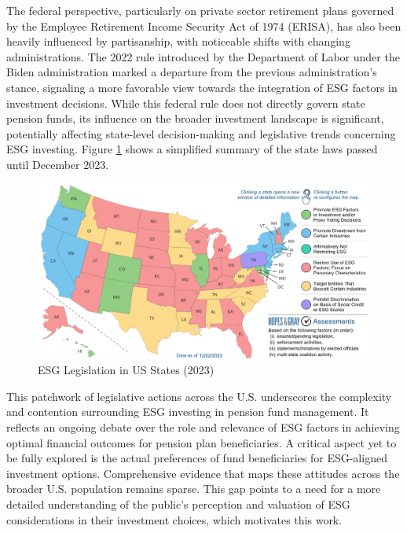 \documentclass[
  12pt,
]{article}
\begin{document}
The federal perspective, particularly on private sector retirement plans governed by the Employee Retirement Income Security Act of 1974 (ERISA), has also been heavily influenced by partisanship, with noticeable shifts with changing administrations. The 2022 rule introduced by the Department of Labor under the Biden administration marked a departure from the previous administration's stance, signaling a more favorable view towards the integration of ESG factors in investment decisions. While this federal rule does not directly govern state pension funds, its influence on the broader investment landscape is significant, potentially affecting state-level decision-making and legislative trends concerning ESG investing. Figure \ref{fig:mapplot} shows a simplified summary of the state laws passed until December 2023.

\begin{figure}

{\centering \includegraphics[width=1\textwidth]{ropesandgrey} 

}

\caption{ESG Legislation in US States (2023)}\label{fig:mapplot}
\end{figure}

This patchwork of legislative actions across the U.S. underscores the complexity and contention surrounding ESG investing in pension fund management. It reflects an ongoing debate over the role and relevance of ESG factors in achieving optimal financial outcomes for pension plan beneficiaries. A critical aspect yet to be fully explored is the actual preferences of fund beneficiaries for ESG-aligned investment options. Comprehensive evidence that maps these attitudes across the broader U.S. population remains sparse. This gap points to a need for a more detailed understanding of the public's perception and valuation of ESG considerations in their investment choices, which motivates this work.
\end{document}
